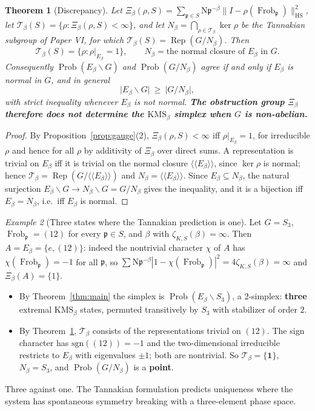 \documentclass[11pt]{amsart}
\numberwithin{equation}{section}
\newtheorem{theorem}{Theorem}[section]
\theoremstyle{definition}
\theoremstyle{remark}
\newtheorem{example}[theorem]{Example}
\newcommand{\cT}{\mathcal{T}}
\newcommand{\pp}{\mathfrak{p}}
\newcommand{\Ns}{\mathrm{N}}
\newcommand{\Frob}{\operatorname{Frob}}
\newcommand{\Rep}{\operatorname{Rep}}
\newcommand{\HS}{\mathrm{HS}}
\newcommand{\Prob}{\operatorname{Prob}}
\begin{document}
\begin{theorem}[Discrepancy]\label{thm:discrepancy}
Let $\Xi_\beta(\rho,S)=\sum_{\pp\in S}\Ns\pp^{-\beta}\|I-\rho(\Frob_\pp)\|_{\HS}^2$, let
$\cT_\beta(S)=\{\rho:\Xi_\beta(\rho,S)<\infty\}$, and let $N_\beta=\bigcap_{\rho\in\cT_\beta}\ker\rho$
be the Tannakian subgroup of Paper VI, for which $\cT_\beta(S)=\Rep(G/N_\beta)$. Then
\[
\cT_\beta(S)=\bigl\{\rho:\rho|_{E_\beta}=1\bigr\},
\qquad
N_\beta=\text{the normal closure of }E_\beta\text{ in }G .
\]
Consequently $\Prob(E_\beta\backslash G)$ and $\Prob(G/N_\beta)$ agree if and only if
$E_\beta$ is normal in $G$, and in general
\[
\bigl|E_\beta\backslash G\bigr|\ \ge\ \bigl|G/N_\beta\bigr| ,
\]
with strict inequality whenever $E_\beta$ is not normal. \textbf{The obstruction group
$\Xi_\beta$ therefore does not determine the $\mathrm{KMS}_\beta$ simplex when $G$ is
non-abelian.}
\end{theorem}

\begin{proof}
By Proposition~\ref{prop:gauge}(2), $\Xi_\beta(\rho,S)<\infty$ iff $\rho|_{E_\beta}=1$, for
irreducible $\rho$ and hence for all $\rho$ by additivity of $\Xi_\beta$ over direct sums.
A representation is
trivial on $E_\beta$ iff it is trivial on the normal closure $\langle\langle E_\beta\rangle\rangle$,
since $\ker\rho$ is normal; hence $\cT_\beta=\Rep(G/\langle\langle E_\beta\rangle\rangle)$ and
$N_\beta=\langle\langle E_\beta\rangle\rangle$. Since $E_\beta\subseteq N_\beta$, the natural
surjection $E_\beta\backslash G\to N_\beta\backslash G=G/N_\beta$ gives the inequality, and it
is a bijection iff $E_\beta=N_\beta$, i.e.\ iff $E_\beta$ is normal.
\end{proof}

\begin{example}[Three states where the Tannakian prediction is one]\label{ex:S3}
Let $G=S_3$, $\Frob_\pp=(12)$ for every $\pp\in S$, and $\beta$ with
$\zeta_{K,S}(\beta)=\infty$. Then $A=E_\beta=\{e,(12)\}$: indeed the nontrivial character
$\chi$ of $A$ has $\chi(\Frob_\pp)=-1$ for all $\pp$, so
$\sum\Ns\pp^{-\beta}|1-\chi(\Frob_\pp)|^2=4\zeta_{K,S}(\beta)=\infty$ and
$\Xi_\beta(A)=\{1\}$.
\begin{itemize}
\item By Theorem~\ref{thm:main} the simplex is $\Prob(E_\beta\backslash S_3)$, a
$2$-simplex: \textbf{three} extremal $\mathrm{KMS}_\beta$ states, permuted transitively by
$S_3$ with stabilizer of order $2$.
\item By Theorem~\ref{thm:discrepancy}, $\cT_\beta$ consists of the representations trivial
on $(12)$. The sign character has $\mathrm{sgn}((12))=-1$ and the two-dimensional
irreducible restricts to $E_\beta$ with eigenvalues $\pm1$; both are nontrivial. So
$\cT_\beta=\{\mathbf 1\}$, $N_\beta=S_3$, and $\Prob(G/N_\beta)$ is a \textbf{point}.
\end{itemize}
Three against one. The Tannakian formulation predicts uniqueness where the system has
spontaneous symmetry breaking with a three-element phase space.
\end{example}
\end{document}
